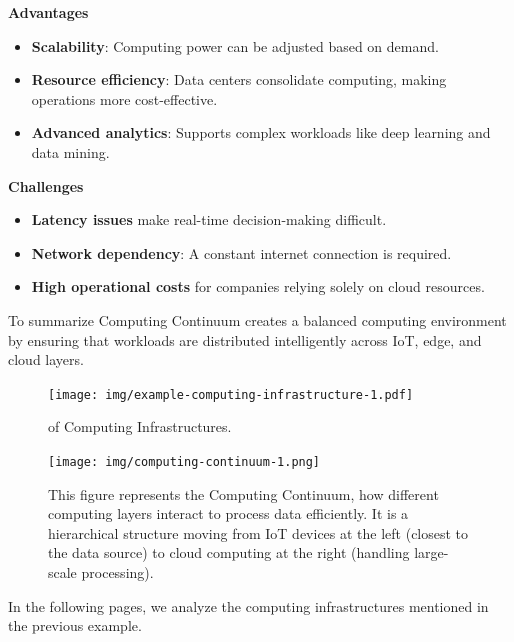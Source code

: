 \begin{enumerate}
    \textcolor{Green3}{ \textbf{Advantages}}
    \begin{itemize}[label=\textcolor{Green3}{}]
        \item \textcolor{Green3}{\textbf{Scalability}}: Computing power can be adjusted based on demand.
        \item \textcolor{Green3}{\textbf{Resource efficiency}}: Data centers consolidate computing, making operations more cost-effective.
        \item \textcolor{Green3}{\textbf{Advanced analytics}}: Supports complex workloads like deep learning and data mining.
    \end{itemize}

    \textcolor{Red2}{ \textbf{Challenges}}
    \begin{itemize}
        \item \textbf{Latency issues} make real-time decision-making difficult.
        \item \textbf{Network dependency}: A constant internet connection is required.
        \item \textbf{High operational costs} for companies relying solely on cloud resources.
    \end{itemize}
\end{enumerate}
To summarize Computing Continuum creates a balanced computing environment by ensuring that workloads are distributed intelligently across IoT, edge, and cloud layers.

\newpage

\begin{figure}[!htp]
    \centering
    \texttt{[image: img/example-computing-infrastructure-1.pdf]}
    \caption{ of Computing Infrastructures.\cite{computing-infrastructures-slides}}
\end{figure}

\highspace

\begin{figure}[!htp]
    \centering
    \texttt{[image: img/computing-continuum-1.png]}
    \caption{This figure represents the Computing Continuum, how different computing layers interact to process data efficiently. It is a hierarchical structure moving from IoT devices at the left (closest to the data source) to cloud computing at the right (handling large-scale processing).\cite{computing-infrastructures-slides}}
\end{figure}

\highspace
In the following pages, we analyze the computing infrastructures mentioned in the previous example.

